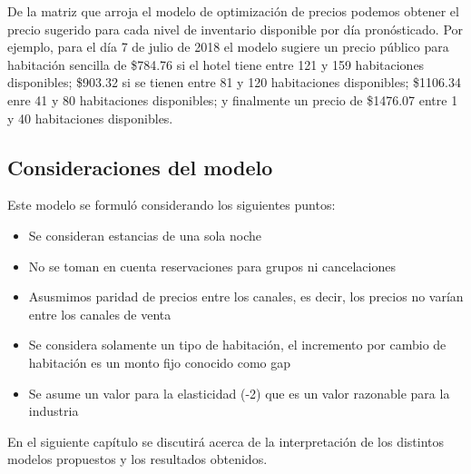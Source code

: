 De la matriz que arroja el modelo de optimización de precios podemos obtener el precio sugerido para cada nivel de inventario disponible por día pronósticado. Por ejemplo, para el día 7 de julio de 2018 el modelo sugiere un precio público para habitación sencilla de \$784.76 si el hotel tiene entre 121 y 159 habitaciones disponibles; \$903.32 si se tienen entre 81 y 120 habitaciones disponibles; \$1106.34 enre 41 y 80 habitaciones disponibles; y finalmente un precio de \$1476.07 entre 1 y 40 habitaciones disponibles.

\subsection*{Consideraciones del modelo}

Este modelo se formuló considerando los siguientes puntos:
\begin{itemize}[noitemsep]
  \item Se consideran estancias de una sola noche
  \item No se toman en cuenta reservaciones para grupos ni cancelaciones
  \item Asusmimos paridad de precios entre los canales, es decir, los precios no varían entre los canales de venta
  \item Se considera solamente un tipo de habitación, el incremento por cambio de habitación es un monto fijo conocido como gap
  \item Se asume un valor para la elasticidad (-2) que es un valor razonable para la industria
\end{itemize}

En el siguiente capítulo se discutirá acerca de la interpretación de los distintos modelos propuestos y los resultados obtenidos.
